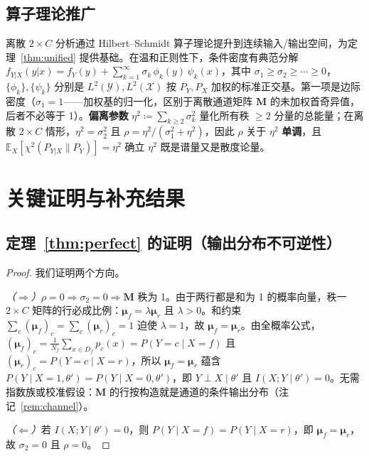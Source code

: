\subsection{算子理论推广}

离散 $2\times C$ 分析通过 Hilbert--Schmidt 算子理论提升到连续输入/输出空间，为定理~\ref{thm:unified} 提供基础。在温和正则性下，条件密度有典范分解 $f_{Y|X}(y|x)=f_Y(y)+\sum_{k=1}^{\infty}\sigma_k\,\phi_k(y)\,\psi_k(x)$，其中 $\sigma_1\ge\sigma_2\ge\cdots\ge0$，$\{\phi_k\},\{\psi_k\}$ 分别是 $L^2(\mathcal{Y}),L^2(\mathcal{X})$ 按 $P_Y,P_X$ 加权的标准正交基。第一项是边际密度（$\sigma_1=1$——加权基的归一化，区别于离散通道矩阵 $\mathbf{M}$ 的未加权首奇异值，后者不必等于 1）。\textbf{偏离参数} $\eta^2\coloneqq\sum_{k\ge2}\sigma_k^2$ 量化所有秩 $\ge2$ 分量的总能量；在离散 $2\times C$ 情形，$\eta^2=\sigma_2^2$ 且 $\rho=\eta^2/(\sigma_1^2+\eta^2)$，因此 $\rho$ 关于 $\eta^2$ \textbf{单调}，且 $\mathbb{E}_X[\chi^2(P_{Y|X}\|P_Y)]=\eta^2$ 确立 $\eta^2$ 既是谱量又是散度论量。

\section{关键证明与补充结果}
\label{sec:appendix}

\subsection{定理~\ref{thm:perfect} 的证明（输出分布不可逆性）}
\label{app:perfect}
\begin{proof}
我们证明两个方向。

\noindent\textit{（$\Rightarrow$）}$\rho=0 \Rightarrow \sigma_2=0 \Rightarrow \mathbf{M}$ 秩为 1。由于两行都是和为 1 的概率向量，秩一 $2\times C$ 矩阵的行必成比例：$\boldsymbol{\mu}_f = \lambda \boldsymbol{\mu}_r$ 且 $\lambda>0$。和约束 $\sum_c (\boldsymbol{\mu}_f)_c = \sum_c (\boldsymbol{\mu}_r)_c = 1$ 迫使 $\lambda=1$，故 $\boldsymbol{\mu}_f = \boldsymbol{\mu}_r$。由全概率公式，$(\boldsymbol{\mu}_f)_c = \frac{1}{N_f}\sum_{x\in D_f}p_c(x) = P(Y{=}c\mid X{=}f)$ 且 $(\boldsymbol{\mu}_r)_c = P(Y{=}c\mid X{=}r)$，所以 $\boldsymbol{\mu}_f=\boldsymbol{\mu}_r$ 蕴含 $P(Y\mid X=1,\theta') = P(Y\mid X=0,\theta')$，即 $Y\perp X\mid\theta'$ 且 $I(X;Y\mid\theta')=0$。无需指数族或校准假设：$\mathbf{M}$ 的行按构造就是通道的条件输出分布（注记~\ref{rem:channel}）。

\noindent\textit{（$\Leftarrow$）}若 $I(X;Y\mid\theta')=0$，则 $P(Y\mid X{=}f)=P(Y\mid X{=}r)$，即 $\boldsymbol{\mu}_f = \boldsymbol{\mu}_r$，故 $\sigma_2=0$ 且 $\rho=0$。
\end{proof}

